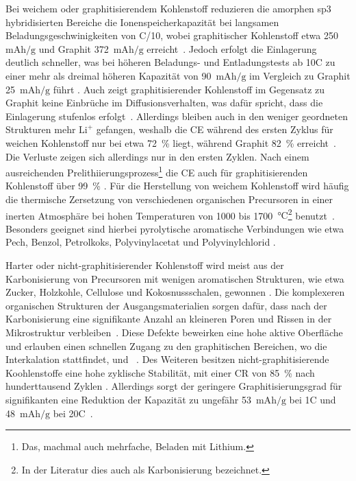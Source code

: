 Bei weichem oder graphitisierendem Kohlenstoff reduzieren die amorphen sp3 hybridisierten Bereiche die Ionenspeicherkapazität bei langsamen Beladungsgeschwinigkeiten von C/10, wobei graphitischer Kohlenstoff etwa 250~$\si{\mA \hour \per \g}$ und Graphit 372~$\si{\mA \hour \per \g}$ erreicht~\cite{Schroeder2014}. Jedoch erfolgt die Einlagerung deutlich schneller, was bei höheren Beladungs- und Entladungstests ab 10C zu einer mehr als dreimal höheren Kapazität von 90~$\si{\mA \hour \per \g}$ im Vergleich zu Graphit 25~$\si{\mA \hour \per \g}$ führt \cite{Schroeder2014}. Auch zeigt graphitisierender Kohlenstoff im Gegensatz zu Graphit keine Einbrüche im Diffusionsverhalten, was dafür spricht, dass die Einlagerung stufenlos erfolgt~\cite{Huajun2007}. Allerdings bleiben auch in den weniger geordneten Strukturen mehr $\text{Li}^{+}$ gefangen, weshalb die CE während des ersten Zyklus für weichen Kohlenstoff nur bei etwa 72~\% liegt, während Graphit 82~\% erreicht~\cite{Schroeder2014}. Die Verluste zeigen sich allerdings nur in den ersten Zyklen. Nach einem ausreichenden Prelithiierungsprozess\footnote{Das, machmal auch mehrfache, Beladen mit Lithium.} die CE auch für graphitisierenden Kohlenstoff über 99~\% \cite{Schroeder2014}. Für die Herstellung von weichem Kohlenstoff wird häufig die thermische Zersetzung von verschiedenen organischen Precursoren in einer inerten Atmosphäre bei hohen Temperaturen von 1000 bis 1700~$\si{\degreeCelsius}$\footnote{In der Literatur dies auch als Karbonisierung bezeichnet.} benutzt~\cite{Ghosh2024,Kim2017a}. Besonders geeignet sind hierbei pyrolytische aromatische Verbindungen wie etwa Pech, Benzol, Petrolkoks, Polyvinylacetat und Polyvinylchlorid \cite{Wang2021}.

Harter oder nicht-graphitisierender Kohlenstoff wird meist aus der Karbonisierung von Precursoren mit wenigen aromatischen Strukturen, wie etwa Zucker, Holzkohle, Cellulose und Kokosnussschalen, gewonnen \cite{Wang2021}. Die komplexeren organischen Strukturen der Ausgangsmaterialien sorgen dafür, dass nach der Karbonisierung eine signifikante Anzahl an kleineren Poren und Rissen in der Mikrostruktur verbleiben~\cite{Liu2019a}. Diese Defekte beweirken eine hohe aktive Oberfläche und erlauben einen schnellen Zugang zu den graphitischen Bereichen, wo die Interkalation stattfindet, und ~\cite{Fujimoto2010}. Des Weiteren besitzen nicht-graphitisierende Koohlenstoffe eine hohe zyklische Stabilität, mit einer CR von 85~\% nach hunderttausend Zyklen \cite{Cao2014}. Allerdings sorgt der geringere Graphitisierungsgrad für signifikanten eine Reduktion der Kapazität zu ungefähr 53~$\si{\mA \hour \per \g}$ bei 1C und 48~$\si{\mA \hour \per \g}$ bei 20C~\cite{Sun2017}.

